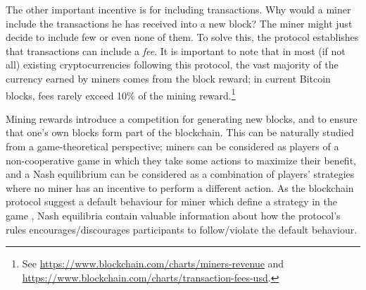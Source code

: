 \iffalse
Assume now that a miner generates a new valid block that points to the last block of the current blockchain. He/she will try to get this new block broadcast across the network as fast as possible, because this makes the branch of such block longer, encouraging other nodes to mine on top of this new block. If he/she keeps this block private, most likely other miners will generate a longer branch without his/her node, and the miner will not be able to place his/her block in the blockchain, missing the associated reward.
\fi

The other important incentive is for including transactions. Why would a miner include the transactions he has received into a new block? The miner might just decide to include few or even none of them. To solve this, the protocol establishes that transactions can include a \emph{fee}. %
It is important to note that in most (if not all) existing cryptocurrencies following this protocol, the vast majority of the currency earned by miners comes from the block reward; in current Bitcoin blocks, fees rarely exceed 10\% of the mining reward.\footnote{See  \url{https://www.blockchain.com/charts/miners-revenue} and \url{https://www.blockchain.com/charts/transaction-fees-usd}.}


\smallskip
{} Mining rewards introduce a competition for generating new blocks, and to ensure that one's own blocks form part of the blockchain. This can be naturally studied from a game-theoretical perspective; miners can be considered as players of a non-cooperative game in which they take some actions to maximize their benefit, and a Nash equilibrium can be considered as a combination of players' strategies where no miner has an incentive to perform a different action. As the blockchain protocol suggest a default behaviour for miner which define a strategy in the game , Nash equilibria contain valuable information about how the protocol's rules encourages/discourages participants to follow/violate the default behaviour. 

